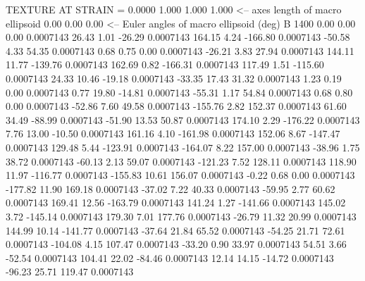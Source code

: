 TEXTURE AT STRAIN =    0.0000
   1.000   1.000   1.000  <-- axes length of macro ellipsoid
    0.00    0.00    0.00  <-- Euler angles of macro ellipsoid (deg)
B      1400
        0.00        0.00        0.00     0.0007143
       26.43        1.01      -26.29     0.0007143
      164.15        4.24     -166.80     0.0007143
      -50.58        4.33       54.35     0.0007143
        0.68        0.75        0.00     0.0007143
      -26.21        3.83       27.94     0.0007143
      144.11       11.77     -139.76     0.0007143
      162.69        0.82     -166.31     0.0007143
      117.49        1.51     -115.60     0.0007143
       24.33       10.46      -19.18     0.0007143
      -33.35       17.43       31.32     0.0007143
        1.23        0.19        0.00     0.0007143
        0.77       19.80      -14.81     0.0007143
      -55.31        1.17       54.84     0.0007143
        0.68        0.80        0.00     0.0007143
      -52.86        7.60       49.58     0.0007143
     -155.76        2.82      152.37     0.0007143
       61.60       34.49      -88.99     0.0007143
      -51.90       13.53       50.87     0.0007143
      174.10        2.29     -176.22     0.0007143
        7.76       13.00      -10.50     0.0007143
      161.16        4.10     -161.98     0.0007143
      152.06        8.67     -147.47     0.0007143
      129.48        5.44     -123.91     0.0007143
     -164.07        8.22      157.00     0.0007143
      -38.96        1.75       38.72     0.0007143
      -60.13        2.13       59.07     0.0007143
     -121.23        7.52      128.11     0.0007143
      118.90       11.97     -116.77     0.0007143
     -155.83       10.61      156.07     0.0007143
       -0.22        0.68        0.00     0.0007143
     -177.82       11.90      169.18     0.0007143
      -37.02        7.22       40.33     0.0007143
      -59.95        2.77       60.62     0.0007143
      169.41       12.56     -163.79     0.0007143
      141.24        1.27     -141.66     0.0007143
      145.02        3.72     -145.14     0.0007143
      179.30        7.01      177.76     0.0007143
      -26.79       11.32       20.99     0.0007143
      144.99       10.14     -141.77     0.0007143
      -37.64       21.84       65.52     0.0007143
      -54.25       21.71       72.61     0.0007143
     -104.08        4.15      107.47     0.0007143
      -33.20        0.90       33.97     0.0007143
       54.51        3.66      -52.54     0.0007143
      104.41       22.02      -84.46     0.0007143
       12.14       14.15      -14.72     0.0007143
      -96.23       25.71      119.47     0.0007143

